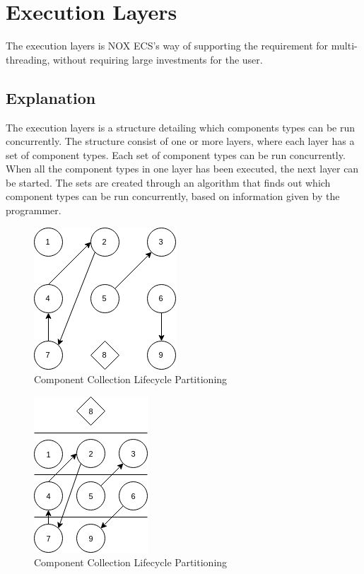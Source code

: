 \section{Execution Layers}
\label{subsec:detailed_execution_layers}
The execution layers is NOX ECS's way of supporting the requirement for multi-threading,
without requiring large investments for the user.

\subsection{Explanation}
The execution layers is a structure detailing which components types can be run concurrently.
The structure consist of one or more layers, where each layer has a set of component types.
Each set of component types can be run concurrently.
When all the component types in one layer has been executed, the next layer can be started.
The sets are created through an algorithm that finds out which component types can be run concurrently,
based on information given by the programmer.

\begin{figure}[tbp]
    \begin{center}
    \includegraphics[scale=0.45]{images/layered_execution_model_1.png}
    \caption[Execution layers, not layered]{Component Collection Lifecycle Partitioning}
    \label{fig:execution_layers_model_1}
    \end{center}
\end{figure}

\begin{figure}[tbp]
    \begin{center}
    \includegraphics[scale=0.45]{images/layered_execution_model_2.png}
    \caption{Component Collection Lifecycle Partitioning}
    \label{fig:execution_layers_model_2}
    \end{center}
\end{figure}

